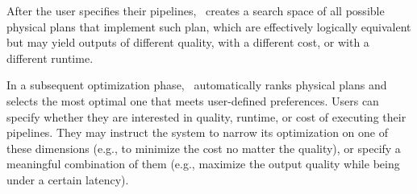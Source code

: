 After the user specifies their pipelines, 
\sys\ creates a search space of all possible physical plans that implement such plan, which are effectively logically equivalent but may yield outputs of different quality, with a different cost, or with a different runtime.

In a subsequent optimization phase, \sys\ automatically ranks physical plans and selects the most optimal one that meets user-defined preferences.
Users can specify whether they are interested in quality, runtime, or cost of executing their pipelines. 
They may instruct the system to narrow its optimization on one of these dimensions (e.g., to minimize the cost no matter the quality), or specify a meaningful combination of them (e.g., maximize the output quality while being under a certain latency).

























